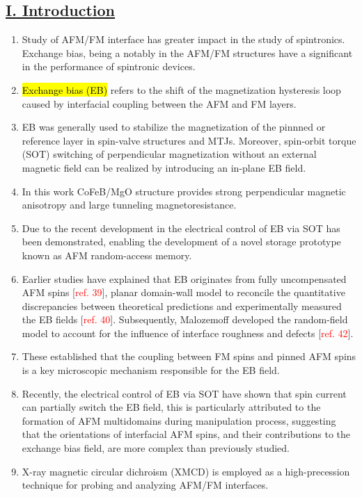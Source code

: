 \subsection*{\centering\underline{I. Introduction}}
\begin{enumerate}
    \item Study of AFM/FM interface has greater impact in the study of spintronics. Exchange bias, being a notably in the AFM/FM structures have a significant in the performance of spintronic devices.
    \item \hl{Exchange bias (EB)} refers to the shift of the magnetization hysteresis loop caused by interfacial coupling between the AFM and FM layers.
    \item EB was generally used to stabilize the magnetization of the pinnned or reference layer in spin-valve structures and MTJs. Moreover, spin-orbit torque (SOT) switching of perpendicular magnetization without an external magnetic field can be realized by introducing an in-plane EB field.
    \item In this work CoFeB/MgO structure provides strong perpendicular magnetic anisotropy and large tunneling magnetoresistance.
    \item Due to the recent development in the electrical control of EB via SOT has been demonstrated, enabling the development of a novel storage prototype known as AFM random-access memory.
    \item Earlier studies  have explained that EB originates from fully uncompensated AFM spins [\textcolor{red}{ref. 39}], planar domain-wall model to reconcile the quantitative discrepancies between theoretical predictions and experimentally measured the EB fields [\textcolor{red}{ref. 40}]. Subsequently, Malozemoff developed the random-field model to account for the influence of interface roughness and defects [\textcolor{red}{ref. 42}].
    \item These established that the coupling between FM spins and pinned AFM  spins is a key microscopic mechanism responsible for the EB field.
    \item Recently, the electrical control of EB via SOT have shown that spin current can partially switch the EB field, this is particularly attributed to the formation of AFM multidomains during manipulation process, suggesting that the orientations of interfacial AFM spins, and their contributions to the exchange bias field, are more complex than previously studied.
    \item X-ray magnetic circular dichroism (XMCD)  is employed as a high-precession technique for probing and analyzing AFM/FM interfaces.

\end{enumerate}
